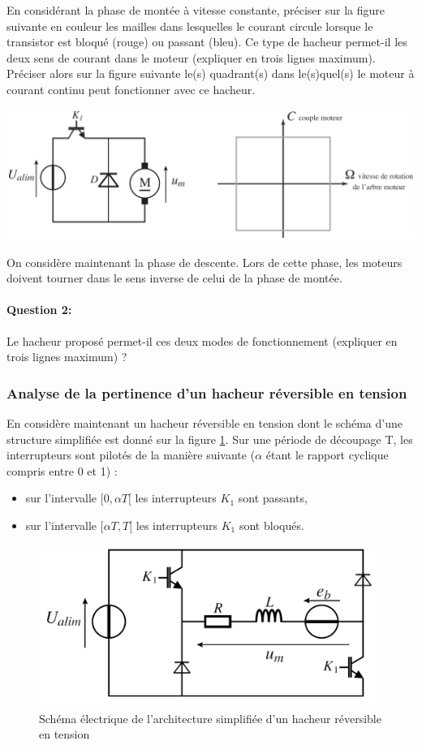En considérant la phase de montée à vitesse constante, préciser sur la figure suivante en couleur les mailles dans lesquelles le courant circule lorsque le transistor est bloqué (rouge) ou passant (bleu). Ce type de hacheur permet-il les deux sens de courant dans le moteur (expliquer en trois lignes maximum). Préciser alors sur la figure suivante le(s) quadrant(s) dans le(s)quel(s) le moteur à courant continu peut fonctionner avec ce hacheur.

\begin{center}
 \includegraphics[width=0.8\linewidth]{img/td02_10}
\end{center}

On considère maintenant la phase de descente. Lors de cette phase, les moteurs doivent tourner dans le
sens inverse de celui de la phase de montée.

\paragraph{Question 2:}

Le hacheur proposé permet-il ces deux modes de fonctionnement (expliquer en trois lignes maximum) ?

\subsubsection{Analyse de la pertinence d'un hacheur réversible en tension}

En considère maintenant un hacheur réversible en tension dont le schéma d'une structure simplifiée est
donné sur la figure \ref{td02_08}. Sur une période de découpage T, les interrupteurs sont pilotés de la manière suivante ($\alpha$ étant le rapport cyclique compris entre 0 et 1) :
\begin{itemize}
 \item sur l'intervalle $[0,\alpha T[$ les interrupteurs $K_1$ sont passants,
 \item sur l'intervalle $[\alpha T , T[$ les interrupteurs $K_1$ sont bloqués.
\end{itemize}

\begin{figure}[!h]
 \centering \includegraphics[width=0.8\linewidth]{img/td02_08}
 \caption{Schéma électrique de l'architecture simplifiée d'un hacheur réversible en tension}
 \label{td02_08}
\end{figure}

